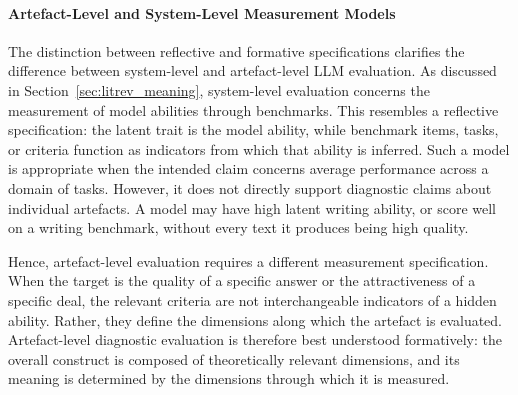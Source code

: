 \paragraph{Artefact-Level and System-Level Measurement Models}

The distinction between reflective and formative specifications clarifies the difference between system-level and artefact-level LLM evaluation. As discussed in Section~\ref{sec:litrev_meaning}, system-level evaluation concerns the measurement of model abilities through benchmarks. This resembles a reflective specification: the latent trait is the model ability, while benchmark items, tasks, or criteria function as indicators from which that ability is inferred. Such a model is appropriate when the intended claim concerns average performance across a domain of tasks. However, it does not directly support diagnostic claims about individual artefacts. A model may have high latent writing ability, or score well on a writing benchmark, without every text it produces being high quality.

Hence, artefact-level evaluation requires a different measurement specification. When the target is the quality of a specific answer or the attractiveness of a specific deal, the relevant criteria are not interchangeable indicators of a hidden ability. Rather, they define the dimensions along which the artefact is evaluated. Artefact-level diagnostic evaluation is therefore best understood formatively: the overall construct is composed of theoretically relevant dimensions, and its meaning is determined by the dimensions through which it is measured. 


